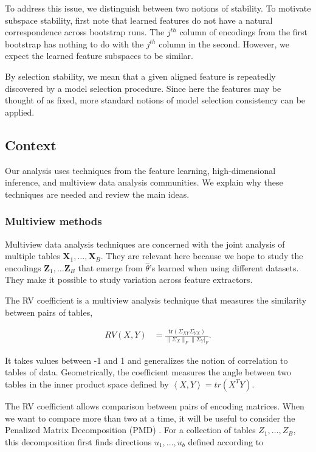 To address this issue, we distinguish between two notions of stability. To motivate subspace stability, first note that learned features do not have a natural correspondence across bootstrap runs. The $j^{th}$ column of encodings from the first bootstrap has nothing to do with the $j^{th}$ column in the second. However, we expect the learned feature subspaces to be similar.

By selection stability, we mean that a given aligned feature is repeatedly discovered by a model selection procedure. Since here the features may be thought of as fixed, more standard notions of model selection consistency can be applied.

\subsection{Context}

Our analysis uses techniques from the feature learning, high-dimensional inference, and multiview data analysis communities. We explain why these techniques are needed and review the main ideas.

\subsubsection{Multiview methods}
Multiview data analysis techniques are concerned with the joint analysis of multiple tables $\mathbf{X}_{1}, \dots, \mathbf{X}_{B}$. They are relevant here because we hope to study the encodings $\mathbf{Z}_{1},\dots \mathbf{Z}_{B}$ that emerge from $\hat{\theta}$’s learned when using different datasets. They make it possible to study variation across feature extractors.

The RV coefficient \cite{josse2016measuring} is a multiview analysis technique that measures the similarity between pairs of tables,

\begin{align*}
  RV\left(X, Y\right) &= \frac{\text{tr}\left(\Sigma_{XY}\Sigma_{YX}\right)}{\|\Sigma_{X}\|_{F}\|\Sigma_{Y}|_{F}}.
  \end{align*}

It takes values between -1 and 1 and generalizes the notion of correlation to tables of data. Geometrically, the coefficient measures the angle between two tables in the inner product space defined by $\left<X, Y\right> = tr\left(X^{T}Y\right)$.

The RV coefficient allows comparison between pairs of encoding matrices. When we want to compare more than two at a time, it will be useful to consider the Penalized Matrix Decomposition (PMD) \cite{witten2009penalized}. For a collection of tables $Z_1, \dots, Z_B$, this decomposition first finds directions $u_1, \dots, u_b$ defined according to

